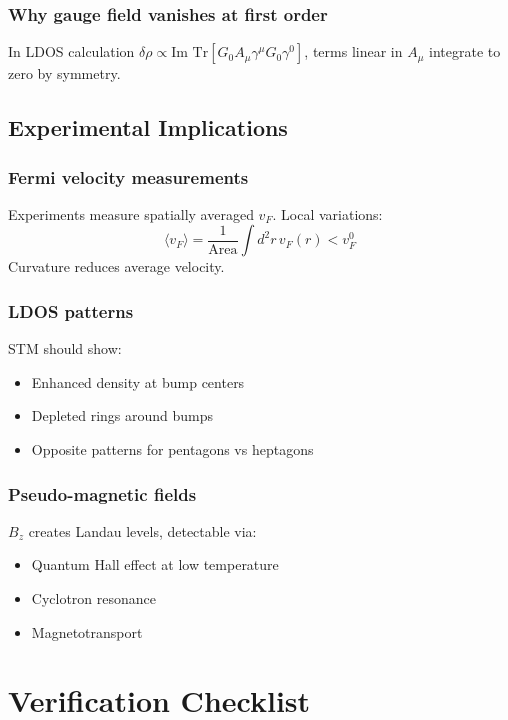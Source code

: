\documentclass[12pt]{article}
\begin{document}
\subsubsection{Why gauge field vanishes at first order}
In LDOS calculation $\delta\rho \propto \text{Im Tr}[G_0 A_\mu \gamma^\mu G_0 \gamma^0]$, terms linear in $A_\mu$ integrate to zero by symmetry.

\subsection{Experimental Implications}

\subsubsection{Fermi velocity measurements}
Experiments measure spatially averaged $v_F$. Local variations:
\begin{equation}
    \langle v_F \rangle = \frac{1}{\text{Area}} \int d^2r \, v_F(r) < v_F^0
\end{equation}
Curvature reduces average velocity.

\subsubsection{LDOS patterns}
STM should show:
\begin{itemize}
    \item Enhanced density at bump centers
    \item Depleted rings around bumps
    \item Opposite patterns for pentagons vs heptagons
\end{itemize}

\subsubsection{Pseudo-magnetic fields}
$B_z$ creates Landau levels, detectable via:
\begin{itemize}
    \item Quantum Hall effect at low temperature
    \item Cyclotron resonance
    \item Magnetotransport
\end{itemize}

\section{Verification Checklist}
\end{document}
